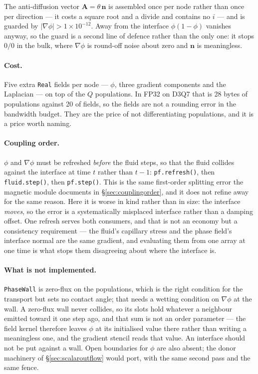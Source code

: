 \documentclass[11pt,a4paper]{article}
\newcommand{\code}[1]{\texttt{\small #1}}
\newcommand{\nn}{\bm{n}}
\newcommand{\e}[1]{\times 10^{#1}}
\begin{document}
The anti-diffusion vector $\bm{A} = \theta\,\nn$ is assembled once per node
rather than once per direction --- it costs a square root and a divide and
contains no $i$ --- and is guarded by $|\nabla\phi| > 1\e{-12}$. Away from the
interface $\phi(1-\phi)$ vanishes anyway, so the guard is a second line of
defence rather than the only one: it stops $0/0$ in the bulk, where $\nabla\phi$
is round-off noise about zero and $\nn$ is meaningless.

\paragraph{Cost.} Five extra \code{Real} fields per node --- $\phi$, three
gradient components and the Laplacian --- on top of the $Q$ populations. In FP32
on D3Q7 that is 28 bytes of populations against 20 of fields, so the fields are
not a rounding error in the bandwidth budget. They are the price of not
differentiating populations, and it is a price worth naming.

\paragraph{Coupling order.} $\phi$ and $\nabla\phi$ must be refreshed
\emph{before} the fluid steps, so that the fluid collides against the interface
at time $t$ rather than $t-1$:
\code{pf.refresh()}, then \code{fluid.step()}, then \code{pf.step()}. This is the
same first-order splitting error the magnetic module documents in
\S\ref{sec:couplingorder}, and it does not refine away for the same reason. Here
it is worse in kind rather than in size: the interface \emph{moves}, so the
error is a systematically misplaced interface rather than a damping offset. One
refresh serves both consumers, and that is not an economy but a consistency
requirement --- the fluid's capillary stress and the phase field's interface
normal are the same gradient, and evaluating them from one array at one time is
what stops them disagreeing about where the interface is.

\paragraph{What is not implemented.} \code{PhaseWall} is zero-flux on the
populations, which is the right condition for the transport but sets no contact
angle; that needs a wetting condition on $\nabla\phi$ at the wall. A zero-flux
wall never collides, so its slots hold whatever a neighbour emitted toward it one
step ago, and that sum is not an order parameter --- the field kernel therefore
leaves $\phi$ at its initialised value there rather than writing a meaningless
one, and the gradient stencil reads that value. An interface should not be put
against a wall. Open boundaries for $\phi$ are also absent; the donor machinery
of \S\ref{sec:scalaroutflow} would port, with the same second pass and the same
fence.
\end{document}
